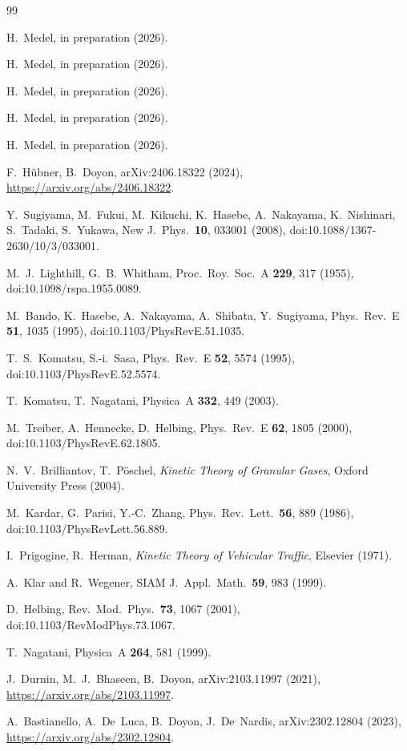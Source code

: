 \documentclass[aps,pre,twocolumn,superscriptaddress,longbibliography,floatfix]{revtex4-2}
\begin{document}
\begin{thebibliography}{99}

H.~Medel,
in preparation (2026).

H.~Medel,
in preparation (2026).

H.~Medel,
in preparation (2026).

H.~Medel,
in preparation (2026).

H.~Medel,
in preparation (2026).

F.~H\"ubner, B.~Doyon,
arXiv:2406.18322 (2024),
\url{https://arxiv.org/abs/2406.18322}.

Y.~Sugiyama, M.~Fukui, M.~Kikuchi, K.~Hasebe, A.~Nakayama,
K.~Nishinari, S.~Tadaki, S.~Yukawa,
New J.~Phys.\ \textbf{10}, 033001 (2008),
doi:10.1088/1367-2630/10/3/033001.

M.~J.~Lighthill, G.~B.~Whitham,
Proc.~Roy.~Soc.~A \textbf{229}, 317 (1955),
doi:10.1098/rspa.1955.0089.

M.~Bando, K.~Hasebe, A.~Nakayama, A.~Shibata, Y.~Sugiyama,
Phys.~Rev.~E \textbf{51}, 1035 (1995),
doi:10.1103/PhysRevE.51.1035.

T.~S.~Komatsu, S.-i.~Sasa,
Phys.~Rev.~E \textbf{52}, 5574 (1995),
doi:10.1103/PhysRevE.52.5574.

T.~Komatsu, T.~Nagatani,
Physica~A \textbf{332}, 449 (2003).

M.~Treiber, A.~Hennecke, D.~Helbing,
Phys.~Rev.~E \textbf{62}, 1805 (2000),
doi:10.1103/PhysRevE.62.1805.

N.~V.~Brilliantov, T.~P\"oschel,
\emph{Kinetic Theory of Granular Gases},
Oxford University Press (2004).

M.~Kardar, G.~Parisi, Y.-C.~Zhang,
Phys.~Rev.~Lett.\ \textbf{56}, 889 (1986),
doi:10.1103/PhysRevLett.56.889.

I.~Prigogine, R.~Herman,
\emph{Kinetic Theory of Vehicular Traffic},
Elsevier (1971).

A.~Klar and R.~Wegener,
SIAM J.~Appl.~Math.\ \textbf{59}, 983 (1999).

D.~Helbing,
Rev.~Mod.~Phys.\ \textbf{73}, 1067 (2001),
doi:10.1103/RevModPhys.73.1067.

T.~Nagatani,
Physica~A \textbf{264}, 581 (1999).

J.~Durnin, M.~J.~Bhaseen, B.~Doyon,
arXiv:2103.11997 (2021),
\url{https://arxiv.org/abs/2103.11997}.

A.~Bastianello, A.~De~Luca, B.~Doyon, J.~De~Nardis,
arXiv:2302.12804 (2023),
\url{https://arxiv.org/abs/2302.12804}.

\end{thebibliography}
\end{document}
